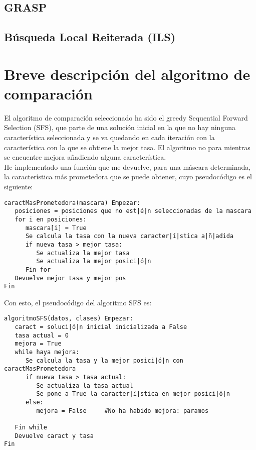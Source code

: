 \documentclass[12pt]{article}
\begin{document}
\subsection{GRASP}

\subsection{Búsqueda Local Reiterada (ILS)}

\newpage

\section{Breve descripción del algoritmo de comparación}
El algoritmo de comparación seleccionado ha sido el greedy Sequential Forward Selection (SFS), que parte de una solución inicial en la que no hay ninguna característica seleccionada y se va quedando en cada iteración con la característica con la que se obtiene la mejor tasa. El algoritmo no para mientras se encuentre mejora añadiendo alguna característica.\\
He implementado una función que me devuelve, para una máscara determinada, la característica más prometedora que se puede obtener, cuyo pseudocódigo es el siguiente:
\begin{lstlisting}
caractMasPrometedora(mascara) Empezar:
   posiciones = posiciones que no est|é|n seleccionadas de la mascara
   for i en posiciones:
      mascara[i] = True
      Se calcula la tasa con la nueva caracter|í|stica a|ñ|adida
      if nueva tasa > mejor tasa:
         Se actualiza la mejor tasa
         Se actualiza la mejor posici|ó|n
      Fin for
   Devuelve mejor tasa y mejor pos
Fin
\end{lstlisting}

Con esto, el pseudocódigo del algoritmo SFS es:
\begin{lstlisting}
algoritmoSFS(datos, clases) Empezar:
   caract = soluci|ó|n inicial inicializada a False
   tasa actual = 0
   mejora = True
   while haya mejora:
      Se calcula la tasa y la mejor posici|ó|n con caractMasPrometedora
      if nueva tasa > tasa actual:
         Se actualiza la tasa actual
         Se pone a True la caracter|í|stica en mejor posici|ó|n
      else:
         mejora = False		#No ha habido mejora: paramos
      
   Fin while
   Devuelve caract y tasa
Fin

\end{lstlisting}
\end{document}
